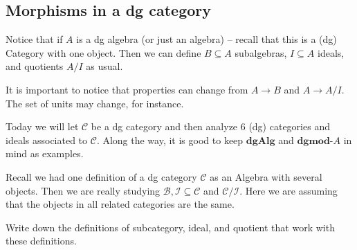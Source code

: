 \documentclass[12pt]{article}
\newcommand*{\dgmodA}{\mathbf{dgmod}\text{-}A}
\begin{document}
\subsection{Morphisms in a dg category}
Notice that if $A$ is a dg algebra (or just an algebra) -- recall that this is a (dg) Category with one object.
Then we can define $B\subseteq A$ subalgebras, $I\subseteq A$ ideals, and quotients $A/I$ as usual.

It is important to notice that properties can change from $A\to B$ and $A\to A/I$. The set of units may change, for instance.

Today we will let $\mathcal C$ be a dg category and then analyze 6 (dg) categories and ideals associated to $\mathcal C$. Along
the way, it is good to keep $\mathbf{dgAlg}$ and $\dgmodA$ in mind as examples.

Recall we had one definition of a dg category $\mathcal C$ as an Algebra with several objects. Then we 
are really studying $\mathcal B,\mathcal I\subseteq\mathcal C$ and $\mathcal C/\mathcal I$. Here we are 
assuming that the objects in all related categories are the same.
\begin{prob}
	Write down the definitions of subcategory, ideal, and quotient that work with these definitions.
\end{prob}
\end{document}
